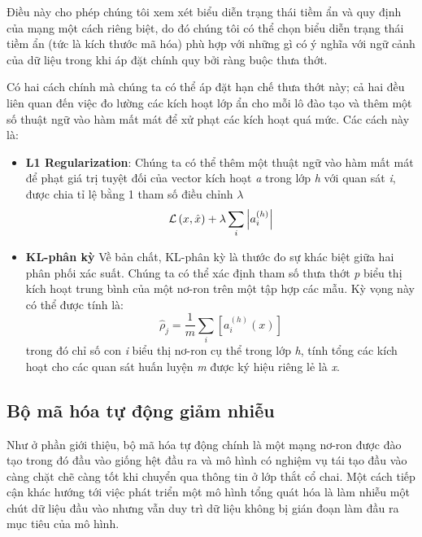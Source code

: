 Điều này cho phép chúng tôi xem xét biểu diễn trạng thái tiềm ẩn
và quy định của mạng một cách riêng biệt, do đó chúng tôi có thể
chọn biểu diễn trạng thái tiềm ẩn (tức là kích thước mã hóa) phù
hợp với những gì có ý nghĩa với ngữ cảnh của dữ liệu trong khi áp
đặt chính quy bởi ràng buộc thưa thớt.

Có hai cách chính mà chúng ta có thể áp đặt hạn chế thưa thớt này;
cả hai đều liên quan đến việc đo lường các kích hoạt lớp ẩn
cho mỗi lô đào tạo và thêm một số thuật ngữ vào hàm mất mát để
xử phạt các kích hoạt quá mức. Các cách này là:

\begin{itemize}[leftmargin=1.5cm]
    \item \textbf{L1 Regularization}: Chúng ta có thể thêm một thuật ngữ vào hàm mất mát
          để phạt giá trị tuyệt đối của vector kích hoạt \textit{a} trong lớp \textit{h} với quan sát \textit{i}, được chia tỉ lệ
          bằng 1 tham số điều chỉnh \textit{$\lambda$}
          \begin{equation}
              {\cal L}\left( {x,\hat x} \right) +  \lambda \sum\limits_i {\left| {a_i^{\left( h \right)}} \right|}
          \end{equation}
    \item \textbf{KL-phân kỳ} Về bản chất, KL-phân kỳ là thước đo sự
          khác biệt giữa hai phân phối xác suất. Chúng ta có thể xác định
          tham số thưa thớt \textit{p} biểu thị kích hoạt trung bình của
          một nơ-ron trên một tập hợp các mẫu. Kỳ vọng này có thể được tính là:
          \begin{equation}
              {{\hat \rho }_ j} = \frac{1}{m}\sum\limits_{i} {\left[ {a_i^{\left( h \right)}\left( x \right)} \right]}
          \end{equation}
          trong đó chỉ số con \textit{i} biểu thị nơ-ron cụ thể trong lớp \textit{h}, tính tổng các kích hoạt
          cho các quan sát huấn luyện \textit{m} được ký hiệu riêng lẻ là \textit{x}.

\end{itemize}

\subsection{Bộ mã hóa tự động giảm nhiễu}

Như ở phần giới thiệu, bộ mã hóa tự động chính là một mạng
nơ-ron được đào tạo
trong đó đầu vào giống hệt đầu ra và mô hình có nghiệm vụ tái
tạo đầu vào càng
chặt chẽ càng tốt khi chuyển qua thông tin ở lớp thắt cổ chai.
Một cách tiếp cận khác hướng tới việc phát triển một mô hình
tổng quát hóa là làm nhiễu một chút dữ liệu đầu vào nhưng vẫn
duy trì dữ liệu không bị gián đoạn làm đầu ra mục tiêu của mô hình.

